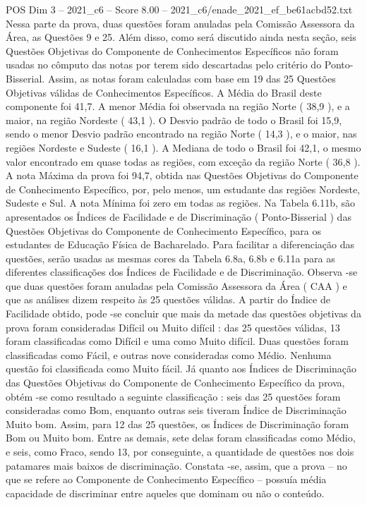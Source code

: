 \begin{textsample}{POS Dim 3 – 2021\_c6 – Score 8.00 – 2021\_c6/enade\_2021\_ef\_be61acbd52.txt}
Nessa parte da prova, duas questões foram anuladas pela Comissão Assessora da Área, as Questões 9 e 25.
Além disso, como será discutido ainda nesta seção, seis Questões Objetivas do Componente de Conhecimentos Específicos não foram usadas no cômputo das notas por terem sido descartadas pelo critério do Ponto-Bisserial.
Assim, as notas foram calculadas com base em 19 das 25 Questões Objetivas válidas de Conhecimentos Específicos.
A Média do Brasil deste componente foi 41,7.
A menor Média foi observada na região Norte ( 38,9 ), e a maior, na região Nordeste ( 43,1 ).
O Desvio padrão de todo o Brasil foi 15,9, sendo o menor Desvio padrão encontrado na região Norte ( 14,3 ), e o maior, nas regiões Nordeste e Sudeste ( 16,1 ).
A Mediana de todo o Brasil foi 42,1, o mesmo valor encontrado em quase todas as regiões, com exceção da região Norte ( 36,8 ).
A nota Máxima da prova foi 94,7, obtida nas Questões Objetivas do Componente de Conhecimento Específico, por, pelo menos, um estudante das regiões Nordeste, Sudeste e Sul.
A nota Mínima foi zero em todas as regiões.
Na Tabela 6.11b, são apresentados os Índices de Facilidade e de Discriminação ( Ponto-Bisserial ) das Questões Objetivas do Componente de Conhecimento Específico, para os estudantes de Educação Física de Bacharelado.
Para facilitar a diferenciação das questões, serão usadas as mesmas cores da Tabela 6.8a, 6.8b e 6.11a para as diferentes classificações dos Índices de Facilidade e de Discriminação.
Observa -se que duas questões foram anuladas pela Comissão Assessora da Área ( CAA ) e que as análises dizem respeito às 25 questões válidas.
A partir do Índice de Facilidade obtido, pode -se concluir que mais da metade das questões objetivas da prova foram consideradas Difícil ou Muito difícil : das 25 questões válidas, 13 foram classificadas como Difícil e uma como Muito difícil.
Duas questões foram classificadas como Fácil, e outras nove consideradas como Médio.
Nenhuma questão foi classificada como Muito fácil.
Já quanto aos Índices de Discriminação das Questões Objetivas do Componente de Conhecimento Específico da prova, obtém -se como resultado a seguinte classificação : seis das 25 questões foram consideradas como Bom, enquanto outras seis tiveram Índice de Discriminação Muito bom.
Assim, para 12 das 25 questões, os Índices de Discriminação foram Bom ou Muito bom.
Entre as demais, sete delas foram classificadas como Médio, e seis, como Fraco, sendo 13, por conseguinte, a quantidade de questões nos dois patamares mais baixos de discriminação.
Constata -se, assim, que a prova – no que se refere ao Componente de Conhecimento Específico – possuía média capacidade de discriminar entre aqueles que dominam ou não o conteúdo.

\end{textsample}
